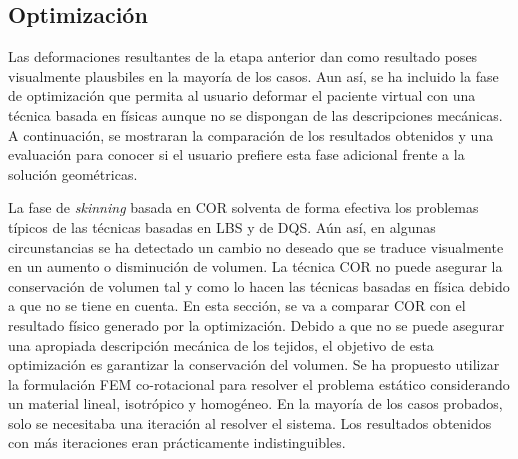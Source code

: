 \subsection{Optimización}
\label{posing:optimizacion}
Las deformaciones resultantes de la etapa anterior dan como resultado poses visualmente plausbiles en la mayoría de los casos. 
Aun así, se ha incluido la fase de optimización que permita al usuario deformar el paciente virtual con una técnica basada en físicas aunque no se dispongan de las descripciones mecánicas. A continuación, se mostraran la comparación de los resultados obtenidos y una evaluación para conocer si el usuario prefiere esta fase adicional frente a la solución geométricas.

La fase de \emph{skinning} basada en \ac{COR} solventa de forma efectiva los problemas típicos de las técnicas basadas en \ac{LBS} y de \ac{DQS}. Aún así, en algunas circunstancias se ha detectado un cambio no deseado que se traduce visualmente en un aumento o disminución de volumen. 
La técnica \ac{COR} no puede asegurar la conservación de volumen tal y como lo hacen las técnicas basadas en física debido a que no se tiene en cuenta. En esta sección, se va a comparar \ac{COR} con el resultado físico generado por la optimización. Debido a que no se puede asegurar una apropiada descripción mecánica de los tejidos, el objetivo de esta optimización es garantizar la conservación del volumen.  
Se ha propuesto utilizar la formulación \ac{FEM} co-rotacional para resolver el problema estático considerando un material lineal, isotrópico y homogéneo. %
En la mayoría de los casos probados, solo se necesitaba una iteración al resolver el sistema. Los resultados obtenidos con más iteraciones eran prácticamente indistinguibles. 
 


